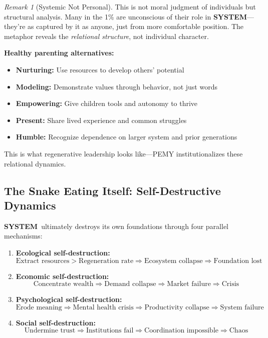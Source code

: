 \documentclass[11pt,a4paper]{article}
\newcommand{\SYSTEM}{\textbf{SYSTEM}}
\theoremstyle{definition}
\theoremstyle{remark}
\newtheorem{remark}{Remark}[section]
\begin{document}
\begin{remark}[Systemic Not Personal]
This is not moral judgment of individuals but structural analysis. Many in the 1\% are unconscious of their role in \SYSTEM---they're as captured by it as anyone, just from more comfortable position. The metaphor reveals the \textit{relational structure}, not individual character.
\end{remark}

\textbf{Healthy parenting alternatives:}
\begin{itemize}[leftmargin=1.5em]
    \item \textbf{Nurturing:} Use resources to develop others' potential
    \item \textbf{Modeling:} Demonstrate values through behavior, not just words
    \item \textbf{Empowering:} Give children tools and autonomy to thrive
    \item \textbf{Present:} Share lived experience and common struggles
    \item \textbf{Humble:} Recognize dependence on larger system and prior generations
\end{itemize}

This is what regenerative leadership looks like---PEMY institutionalizes these relational dynamics.

\subsection{The Snake Eating Itself: Self-Destructive Dynamics}

\SYSTEM\ ultimately destroys its own foundations through four parallel mechanisms:

\begin{enumerate}[leftmargin=1.5em]
    \item \textbf{Ecological self-destruction:}
    \[
    \text{Extract resources} > \text{Regeneration rate} \Rightarrow \text{Ecosystem collapse} \Rightarrow \text{Foundation lost}
    \]
    
    \item \textbf{Economic self-destruction:}
    \[
    \text{Concentrate wealth} \Rightarrow \text{Demand collapse} \Rightarrow \text{Market failure} \Rightarrow \text{Crisis}
    \]
    
    \item \textbf{Psychological self-destruction:}
    \[
    \text{Erode meaning} \Rightarrow \text{Mental health crisis} \Rightarrow \text{Productivity collapse} \Rightarrow \text{System failure}
    \]
    
    \item \textbf{Social self-destruction:}
    \[
    \text{Undermine trust} \Rightarrow \text{Institutions fail} \Rightarrow \text{Coordination impossible} \Rightarrow \text{Chaos}
    \]
\end{enumerate}
\end{document}
